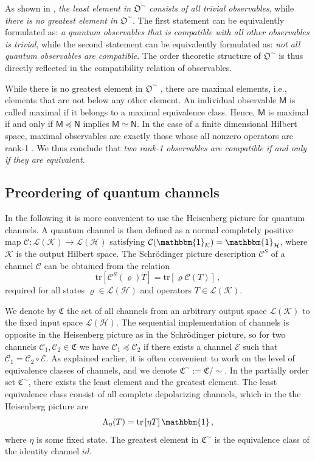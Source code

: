 \documentclass[12pt]{article}
\theoremstyle{definition}
\newcommand{\hi}{\mathcal{H}} %
\newcommand{\hik}{\mathcal{K}} %
\newcommand{\lh}{\mathcal{L(H)}} %
\newcommand{\lk}{\mathcal{L(K)}} %
\newcommand{\tr}[1]{\textrm{tr}\left[#1\right]} %
\newcommand{\id}{\mathbbm{1}} %
\newcommand{\Mo}{\mathsf{M}}%
\newcommand{\No}{\mathsf{N}}%
\newcommand{\chan}{\mathfrak{C}}
\newcommand{\Cc}{\mathcal{C}} %
\newcommand{\pleq}{\preceq}
\newcommand{\obs}{\mathfrak{O}}
\begin{document}
{As shown in \cite{MaMu90a}, \emph{the least element in $\obs^\sim$ consists of all trivial observables}, while \emph{there is no greatest element in $\obs^\sim$}. 
The first statement can be equivalently formulated as: \emph{a quantum observables that is compatible with all other observables is trivial}, while the second statement can be equivalently formulated as: \emph{not all quantum observables are compatible}. 
The order theoretic structure of $\obs^\sim$ is thus directly reflected in the compatibility relation of observables.

While there is no greatest element in $\obs^\sim$ , there are maximal elements, i.e., elements that are not below any other element.
An individual observable $\Mo$ is called maximal if it belongs to a maximal equivalence class. 
Hence, $\Mo$ is maximal if and only if $\Mo \pleq \No$ implies $\Mo\simeq \No$.
In the case of a finite dimensional Hilbert space, maximal observables are exactly those whose all nonzero operators are rank-1 \cite{MaMu90a}.
We thus conclude that \emph{two rank-1 observables are compatible if and only if they are equivalent.}


\subsection{Preordering of quantum channels}
 
In the following it is more convenient to use the Heisenberg picture for quantum channels.
A quantum channel is then defined as a normal completely positive map $\Cc: \lk \to \lh$ satisfying $\Cc(\id_{\hik})=\id_{\hi}$, where $\hik$ is the output Hilbert space. 
The Schr\"odinger picture description $\Cc^S$ of a channel $\Cc$ can be obtained from the relation
\begin{equation}
\tr{\Cc^S(\varrho)T}=\tr{\varrho \Cc(T)} \, , 
\end{equation}
required for all states $\varrho\in\lh$ and operators $T\in\lk$.


We denote by $\chan$ the set of all channels from an arbitrary output space $\lk$ to the fixed input space $\lh$.
The sequential implementation of channels is opposite in the Heisenberg picture as in the Schr\"odinger picture, so for two channels $\Cc_1, \Cc_2\in \chan$ we have $\Cc_1 \pleq \Cc_2$ if there exists a channel $\mathcal{E}$ such that $\Cc_1 =\Cc_2 \circ \mathcal{E}$. 
As explained earlier, it is often convenient to work on the level of equivalence classes of channels, and we denote
$\chan^\sim:=\chan / \sim$. 
In the partially order set $\chan^\sim$, there exists the least element and the greatest element. 
The least equivalence class consist of all complete depolarizing channels, which in the 
the Heisenberg picture are
\begin{equation}
\Lambda_{\eta}(T)=\tr{\eta T}\id \, ,
\end{equation} 
where $\eta$ is some fixed state.
The greatest element in $\chan^\sim$ is the equivalence class of the identity channel $id$. 

}
\end{document}
